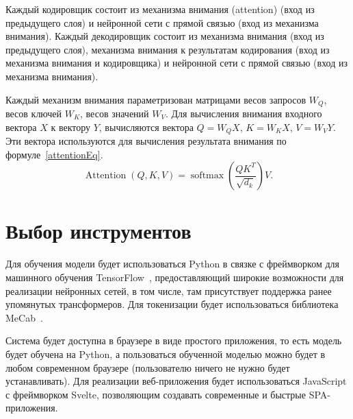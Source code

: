 Каждый кодировщик состоит из механизма внимания (attention) (вход из предыдущего слоя) и нейронной сети с прямой связью (вход из механизма внимания). Каждый декодировщик состоит из механизма внимания (вход из предыдущего слоя), механизма внимания к результатам кодирования (вход из механизма внимания и кодировщика) и нейронной сети с прямой связью (вход из механизма внимания).

Каждый механизм внимания параметризован матрицами весов запросов $W_{Q}$, весов ключей $W_{K}$, весов значений $W_{V}$. Для вычисления внимания входного вектора $X$ к вектору $Y$, вычисляются вектора $Q=W_{Q}X$, $K=W_{K}X$, $V=W_{V}Y$. Эти вектора используются для вычисления результата внимания по формуле~\eqref{attentionEq}. 
\begin{equation}\label{attentionEq}%
  \operatorname{Attention}(Q, K, V) = \operatorname{softmax}\left(\frac{QK^T}{\sqrt{d_k}}\right) V.
\end{equation}
% 
% 
% 


\section{Выбор инструментов}


Для обучения модели будет использоваться Python в связке с фреймворком для машинного обучения TensorFlow~\cite{Tensorflow}, предоставляющий широкие возможности для реализации нейронных сетей, в том числе, там присутствует поддержка ранее упомянутых трансформеров.
Для токенизации будет использоваться библиотека MeCab~\cite{MeCab}.

Система будет доступна в браузере в виде простого приложения, то есть модель будет обучена на Python, а пользоваться обученной моделью можно будет в любом современном браузере (пользователю ничего не нужно будет устанавливать).
Для реализации веб-приложения будет использоваться JavaScript с фреймворком Svelte, позволяющим создавать современные и быстрые SPA-приложения.
